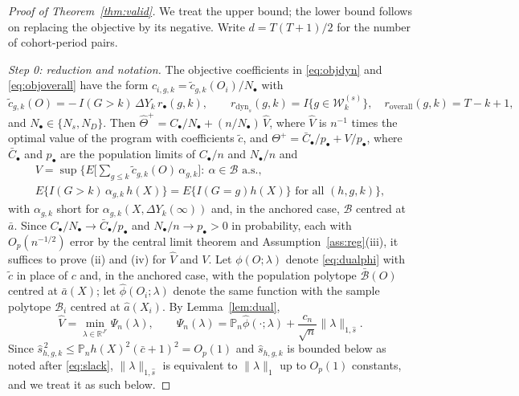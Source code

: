 \documentclass[12pt]{article}
\theoremstyle{remark}
\begin{document}
\begin{proof}[Proof of Theorem~\ref{thm:valid}]
We treat the upper bound; the lower bound follows on replacing the objective by its
negative. Write $d = T(T{+}1)/2$ for the number of cohort-period pairs.

\emph{Step 0: reduction and notation.} The objective coefficients in \eqref{eq:objdyn} and
\eqref{eq:objoverall} have the form $c_{i,g,k} = \tilde c_{g,k}(O_i)/N_\bullet$ with
\[
\tilde c_{g,k}(O) = -\,I(G{>}k)\,\Delta Y_k\, r_\bullet(g,k),
\qquad
r_{\mathrm{dyn}_s}(g,k) = I\{g \in \mathcal{W}^{(s)}_k\},\quad
r_{\mathrm{overall}}(g,k) = T-k+1,
\]
and $N_\bullet \in \{N_s, N_D\}$. Then $\widehat\Theta^{+} = C_\bullet/N_\bullet +
(n/N_\bullet)\,\widehat V$, where $\widehat V$ is $n^{-1}$ times the optimal value of the
program with coefficients $\tilde c$, and $\Theta^{+} = \bar C_\bullet/p_\bullet +
V/p_\bullet$, where $\bar C_\bullet$ and $p_\bullet$ are the population limits of
$C_\bullet/n$ and $N_\bullet/n$ and
\begin{multline*}
V = \sup\Big\{ E\Big[\sum_{g \le k} \tilde c_{g,k}(O)\,\alpha_{g,k}\Big] :\
 \alpha \in \mathcal{B} \text{ a.s.},\\
 E\{I(G{>}k)\,\alpha_{g,k}\,h(X)\} = E\{I(G{=}g)h(X)\}
 \text{ for all } (h,g,k) \Big\},
\end{multline*}
with $\alpha_{g,k}$ short for $\alpha_{g,k}(X, \Delta Y_k(\infty))$ and, in the anchored
case, $\mathcal{B}$ centred at $\bar a$. Since $C_\bullet/N_\bullet \to \bar C_\bullet/p_\bullet$
and $N_\bullet/n \to p_\bullet > 0$ in probability, each with $O_p(n^{-1/2})$ error by the
central limit theorem and Assumption~\ref{ass:reg}(iii), it suffices to prove (ii) and (iv)
for $\widehat V$ and $V$. Let $\phi(O;\lambda)$ denote \eqref{eq:dualphi} with $\tilde c$
in place of $c$ and, in the anchored case, with the population polytope
$\bar{\mathcal{B}}(O)$ centred at $\bar a(X)$; let $\widehat\phi(O_i;\lambda)$ denote the
same function with the sample polytope $\mathcal{B}_i$ centred at $\widehat a(X_i)$. By
Lemma~\ref{lem:dual},
\[
\widehat V = \min_{\lambda \in \mathbb{R}^{J'}} \Psi_n(\lambda),
\qquad
\Psi_n(\lambda) = \mathbb{P}_n \widehat\phi(\cdot;\lambda) + \frac{c_n}{\sqrt n}\|\lambda\|_{1,\widehat s} .
\]
Since $\widehat s_{h,g,k}^{\,2} \le \mathbb{P}_n h(X)^2 (\bar c + 1)^2 = O_p(1)$ and
$\widehat s_{h,g,k}$ is bounded below as noted after \eqref{eq:slack},
$\|\lambda\|_{1,\widehat s}$ is equivalent to $\|\lambda\|_1$ up to $O_p(1)$ constants, and
we treat it as such below.


\end{proof}
\end{document}
